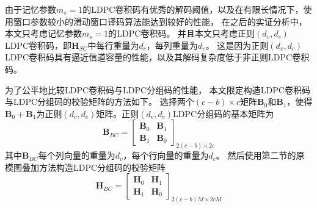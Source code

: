 由于记忆参数$m_s=1$的LDPC卷积码有优秀的解码阈值，以及在有限长情况下，使用窗口参数较小的滑动窗口译码算法能达到较好的性能，
在之后的实证分析中，本文只考虑记忆参数$m_s=1$的LDPC卷积码。
并且本文只考虑正则$(d_v,d_c)$LDPC卷积码，即$\mathbf{H}_{SC}$中每行重量为$d_c$，每列重量为$d_v$。
这是因为正则$(d_v,d_c)$LDPC卷积码具有逼近信道容量的性能，以及其解码复杂度低于非正则LDPC卷积码。

为了公平地比较LDPC卷积码与LDPC分组码的性能，
本文限定构造LDPC卷积码与LDPC分组码的校验矩阵的方法如下。
选择两个$(c-b)\times c$矩阵$\mathbf{B}_0$和$\mathbf{B}_1$，使得$\mathbf{B}_0 + \mathbf{B}_1$为正则$(d_v,d_c)$矩阵。正则$(d_v,d_c)$LDPC分组码的基本矩阵为
\begin{equation}
    \mathbf{B}_{BC} = \left[
          \begin{array}{cc}
            \mathbf{B}_0 & \mathbf{B}_1\\
            \mathbf{B}_1 & \mathbf{B}_0
          \end{array} \right]_{2(c-b)\times 2c}
\end{equation}
其中$\mathbf{B}_{BC}$每个列向量的重量为$d_v$，每个行向量的重量为$d_c$。
然后使用第二节的原模图叠加方法构造LDPC分组码的校验矩阵
\begin{equation}
    \mathbf{H}_{BC} = \left[
          \begin{array}{cc}
            \mathbf{H}_0 & \mathbf{H}_1\\
            \mathbf{H}_1 & \mathbf{H}_0
          \end{array} \right]_{2(c-b)M \times 2cM}
\end{equation}

